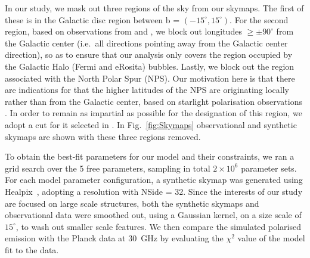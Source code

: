 \documentclass[usenatbib]{mnras}
\begin{document}
In our study, we mask out three regions of the sky from our skymaps. The first of these is in the Galactic disc region between b = $(-15^{\circ},15^{\circ})$. For the second region, based on observations from \cite{Su_2010} and \cite{eROSITA}, we block out longitudes  $\geq \pm 90^{\circ}$ from the Galactic center (i.e.~all directions pointing away from the Galactic center direction), so as to ensure that our analysis only covers the region occupied by the Galactic Halo (Fermi and eRosita) bubbles. Lastly, we block out the region associated with the North Polar Spur (NPS). Our motivation here is that there are indications for that the higher latitudes of the NPS are originating locally rather than from the Galactic center, based on starlight polarisation observations \citep{Gina_2021}. In order to remain as impartial as possible for the designation of this region, we adopt a cut for it selected in \cite{Wolleben_2007}. In Fig.~\ref{fig:Skymaps} observational and synthetic skymaps are shown with these three regions removed.


To obtain the best-fit parameters for our model and their constraints, we ran a grid search over the 5 free parameters, sampling in total $2\times 10^{6}$ parameter sets. For each model parameter configuration, a synthetic skymap was generated using Healpix~\citep{Healpix_2005}, adopting a resolution with NSide = 32. Since the interests of our study are focused on large scale structures, both the synthetic skymaps and observational data were smoothed out, using a Gaussian kernel, on a size scale of $15^{\circ}$, to wash out smaller scale features. We then compare the simulated polarised emission with the Planck data at 30~GHz by evaluating the $\chi^{2}$ value of the model fit to the data. %
\end{document}
